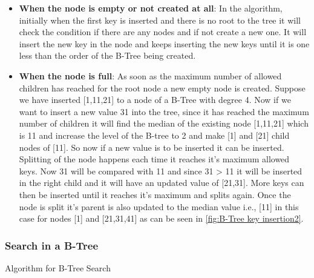 \begin{itemize}
\item
\textbf{When the node is empty or not created at all}:
In the algorithm, initially when the first key is inserted and there is no root to the tree it will check the condition if there are any nodes and if not create a new one. It will insert the new key in the node and keeps inserting the new keys until it is one less than the order of the B-Tree being created. 
\item
\textbf{When the node is full}:
As soon as the maximum number of allowed children has reached for the root node a new empty node is created. Suppose we have inserted [1,11,21] to a node of a B-Tree with degree 4. Now if we want to insert a new value 31 into the tree, since it has reached the maximum number of children it will find the median of the existing node [1,11,21] which is 11 and increase the level of the B-tree to 2 and make [1] and [21] child nodes of [11]. So now if a new value is to be inserted it can be inserted. Splitting of the node happens each time it reaches it's maximum allowed keys. Now 31 will be compared with 11 and since 31 > 11 it will be inserted in the right child and it will have an updated value of [21,31]. More keys can then be inserted until it reaches it's maximum and splits again. Once the node is split it's parent is also updated to the median value i.e., [11] in this case for nodes [1] and [21,31,41] as can be seen in \ref{fig:B-Tree key insertion2}.
\end{itemize}

\subsubsection{Search in a B-Tree}

\begin{algorithm}[H]
    \SetAlgoLined
     \caption{Algorithm for B-Tree Search}
     \label{B-Tree Search}
\end{algorithm}

